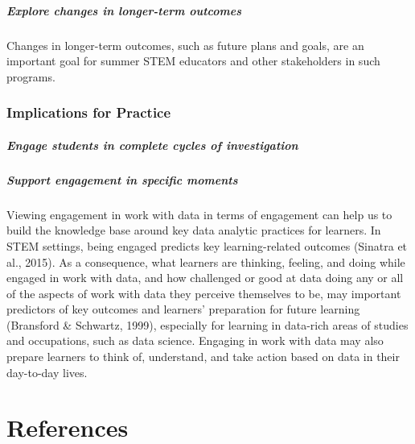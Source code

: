 \documentclass[]{book}
\let\oldparagraph\paragraph
\renewcommand{\paragraph}[1]{\oldparagraph{#1}\mbox{}}
\theoremstyle{definition}
\theoremstyle{definition}
\theoremstyle{definition}
\theoremstyle{remark}
\begin{document}
\paragraph{Explore changes in longer-term
outcomes}\label{explore-changes-in-longer-term-outcomes}

Changes in longer-term outcomes, such as future plans and goals, are an
important goal for summer STEM educators and other stakeholders in such
programs.

\subsection{Implications for Practice}\label{implications-for-practice}

\paragraph{Engage students in complete cycles of
investigation}\label{engage-students-in-complete-cycles-of-investigation}

\paragraph{Support engagement in specific
moments}\label{support-engagement-in-specific-moments}

Viewing engagement in work with data in terms of engagement can help us
to build the knowledge base around key data analytic practices for
learners. In STEM settings, being engaged predicts key learning-related
outcomes (Sinatra et al., 2015). As a consequence, what learners are
thinking, feeling, and doing while engaged in work with data, and how
challenged or good at data doing any or all of the aspects of work with
data they perceive themselves to be, may important predictors of key
outcomes and learners' preparation for future learning (Bransford \&
Schwartz, 1999), especially for learning in data-rich areas of studies
and occupations, such as data science. Engaging in work with data may
also prepare learners to think of, understand, and take action based on
data in their day-to-day lives.

\chapter{References}\label{references}
\end{document}
